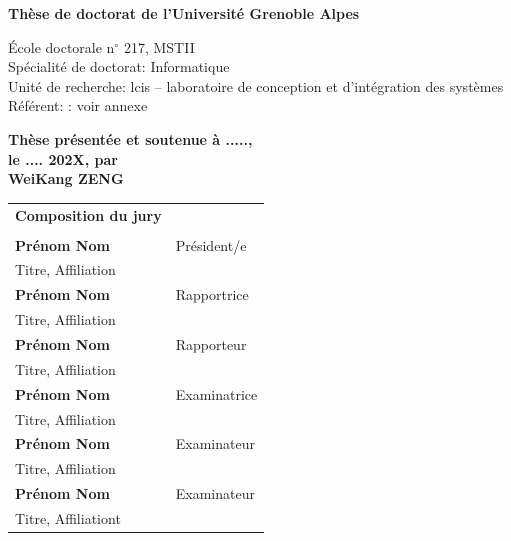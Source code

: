 \documentclass[french,12pt,a4paper]{book}
\begin{document}
\begin{titlepage}

\vspace{1.5cm}
\normalsize

\textbf{Thèse de doctorat de l'Université Grenoble Alpes}


\vspace{15mm}

École doctorale n$^{\circ}$ 217, MSTII\\
\small Spécialité de doctorat: Informatique\\
\footnotesize Unité de recherche: lcis – laboratoire de conception et d'intégration des systèmes\\
\footnotesize Référent: : voir annexe
\vspace{15mm}

\textbf{Thèse présentée et soutenue à .....,\\ le .... 202X, par}\\
\bigskip
\Large {\color{orange} \textbf{WeiKang ZENG}}


\vspace{\fill} %

\bigskip

\flushleft

\scriptsize
\begin{tabular}{|p{7cm}l}
\arrayrulecolor{orange}
{\footnotesize \textbf{Composition du jury}}\\
& \\
\textbf{Prénom Nom} &   Président/e\\ 
Titre, Affiliation & \\
\textbf{Prénom Nom} &  Rapportrice \\ 
Titre, Affiliation   &   \\ 
\textbf{Prénom Nom} &  Rapporteur \\ 
Titre, Affiliation  &   \\ 
\textbf{Prénom Nom} &  Examinatrice \\ 
Titre, Affiliation   &   \\ 
\textbf{Prénom Nom} &  Examinateur \\ 
Titre, Affiliation   &   \\ 
\textbf{Prénom Nom} &  Examinateur \\ 
Titre, Affiliationt   &   \\ 


\end{tabular}
\end{titlepage}
\end{document}

